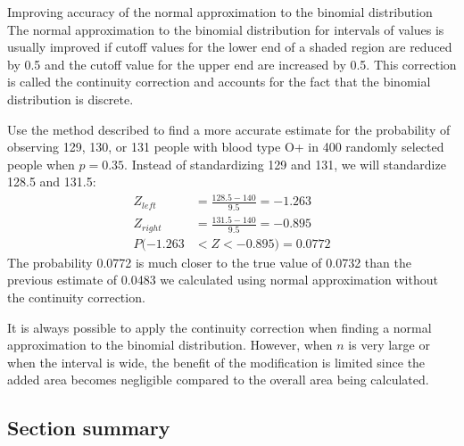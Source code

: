\begin{onebox}{Improving accuracy of the normal approximation to the binomial distribution}
The normal approximation to the binomial distribution for intervals of values is usually improved if cutoff values for the lower end of a shaded region are reduced by 0.5 and the cutoff value for the upper end are increased by 0.5. This correction is called the continuity correction and accounts for the fact that the binomial distribution is discrete.\end{onebox}

\begin{examplewrap}
\begin{nexample}{Use the method described to find a more accurate estimate for the probability of observing 129, 130, or 131 people with blood type O+ in 400 randomly selected people when $p=0.35$.}
Instead of standardizing 129 and 131, we will standardize 128.5 and 131.5:
\begin{align*}
Z_{left} &= \frac{128.5-140}{9.5} = -1.263 \\
Z_{right} &= \frac{131.5-140}{9.5} = -0.895 \\
P(-1.263 &< Z < -0.895) = 0.0772
\end{align*}
The probability 0.0772 is much closer to the true value of 0.0732 than the previous estimate of 0.0483 we calculated using normal approximation without the continuity correction.
\end{nexample}
\end{examplewrap}

It is always possible to apply the continuity correction when finding a normal approximation to the binomial distribution. However, when $n$ is very large or when the interval is wide, the benefit of the modification is limited since the added area becomes negligible compared to the overall area being calculated.



\D{\newpage}

\subsection*{Section summary}

